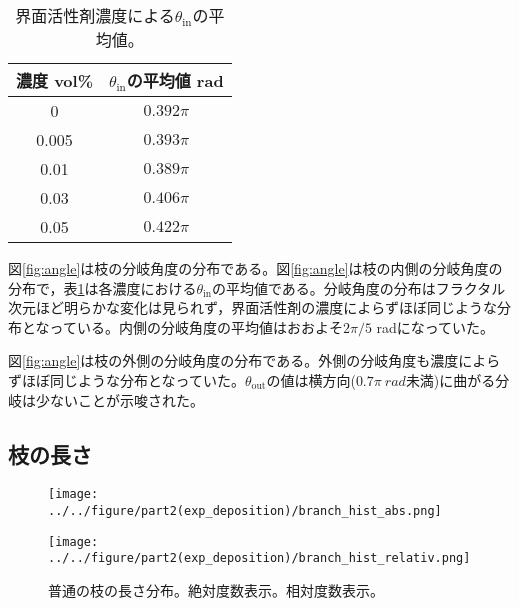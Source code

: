\documentclass[autodetect-engine,dvi=dvipdfmx,a4paper,ja=standard,oneside,openany,11pt]{bxjsbook}
\begin{document}
\begin{table}
  \centering
  \caption{界面活性剤濃度による$\theta_{\mathrm{in}}$の平均値。}
  \begin{tabular}{|c|c|}
    \hline
    濃度 vol\% & $\theta_{\mathrm{in}}$の平均値 rad \\
    \hline\hline
    0        & $0.392\pi$                     \\ \hline
    0.005    & $0.393\pi$                     \\ \hline
    0.01     & $0.389\pi$                     \\ \hline
    0.03     & $0.406\pi$                     \\ \hline
    0.05     & $0.422\pi$                     \\
    \hline
  \end{tabular}
  \label{tab:angle_average}
\end{table}

図\ref{fig:angle}は枝の分岐角度の分布である。図\ref{fig:angle}は枝の内側の分岐角度の分布で，表\ref{tab:angle_average}は各濃度における$\theta_{\mathrm{in}}$の平均値である。分岐角度の分布はフラクタル次元ほど明らかな変化は見られず，界面活性剤の濃度によらずほぼ同じような分布となっている。内側の分岐角度の平均値はおおよそ$2\pi/5$ radになっていた。

図\ref{fig:angle}は枝の外側の分岐角度の分布である。外側の分岐角度も濃度によらずほぼ同じような分布となっていた。$\theta_{\mathrm{out}}$の値は横方向($0.7\pi \ \si{rad}$未満)に曲がる分岐は少ないことが示唆された。
\subsection{枝の長さ}

\begin{figure}[htbp]
  \begin{minipage}
    {0.45\textwidth}
    \subcaption{}
    \centering
    \texttt{[image: ../../figure/part2(exp\_deposition)/branch\_hist\_abs.png]}
    \label{fig:branch_length_absolute}
  \end{minipage}
  \begin{minipage}
    {0.45\textwidth}
    \subcaption{}
    \centering
    \texttt{[image: ../../figure/part2(exp\_deposition)/branch\_hist\_relativ.png]}
    \label{fig:branch_length_relativ}
  \end{minipage}
  \caption{普通の枝の長さ分布。絶対度数表示。相対度数表示。}
  \label{fig:branch_length}
\end{figure}
\end{document}
